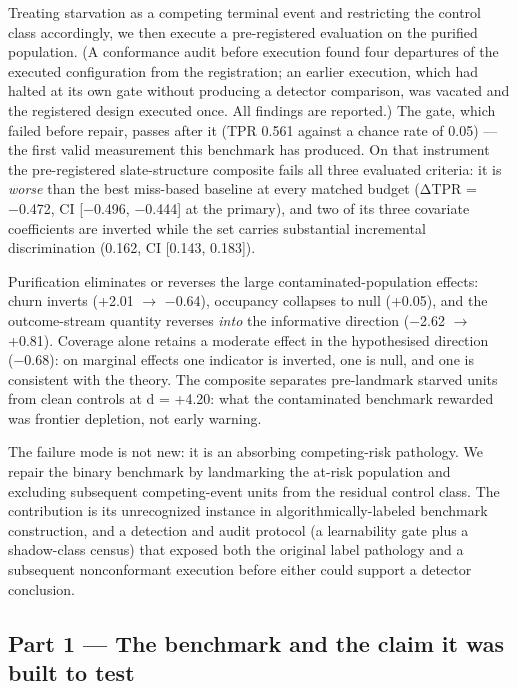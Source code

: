 \documentclass[
  11pt,
]{article}
\begin{document}
Treating starvation as a competing terminal event and restricting the
control class accordingly, we then execute a pre-registered evaluation
on the purified population. (A conformance audit before execution found
four departures of the executed configuration from the registration; an
earlier execution, which had halted at its own gate without producing a
detector comparison, was vacated and the registered design executed
once. All findings are reported.) The gate, which failed before repair,
passes after it (TPR 0.561 against a chance rate of 0.05) --- the first
valid measurement this benchmark has produced. On that instrument the
pre-registered slate-structure composite fails all three evaluated
criteria: it is \emph{worse} than the best miss-based baseline at every
matched budget (ΔTPR = −0.472, CI {[}−0.496, −0.444{]} at the primary),
and two of its three covariate coefficients are inverted while the set
carries substantial incremental discrimination (0.162, CI {[}0.143,
0.183{]}).

Purification eliminates or reverses the large contaminated-population
effects: churn inverts (+2.01 \(\rightarrow\) −0.64), occupancy
collapses to null (+0.05), and the outcome-stream quantity reverses
\emph{into} the informative direction (−2.62 \(\rightarrow\) +0.81).
Coverage alone retains a moderate effect in the hypothesised direction
(−0.68): on marginal effects one indicator is inverted, one is null, and
one is consistent with the theory. The composite separates pre-landmark
starved units from clean controls at d = +4.20: what the contaminated
benchmark rewarded was frontier depletion, not early warning.

The failure mode is not new: it is an absorbing competing-risk
pathology. We repair the binary benchmark by landmarking the at-risk
population and excluding subsequent competing-event units from the
residual control class. The contribution is its unrecognized instance in
algorithmically-labeled benchmark construction, and a detection and
audit protocol (a learnability gate plus a shadow-class census) that
exposed both the original label pathology and a subsequent nonconformant
execution before either could support a detector conclusion.

\subsection{Part 1 --- The benchmark and the claim it was built to
test}\label{part-1-the-benchmark-and-the-claim-it-was-built-to-test}
\end{document}
